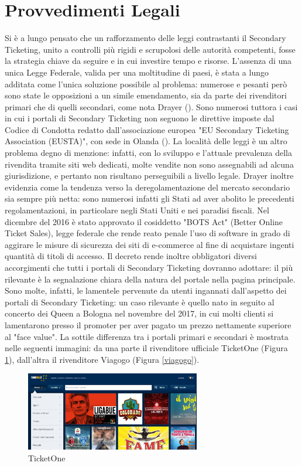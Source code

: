 \section{Provvedimenti Legali}
Si è a lungo pensato che un rafforzamento delle leggi contrastanti il Secondary Ticketing, unito a controlli più rigidi e scrupolosi delle autorità competenti, fosse la strategia chiave da seguire e in cui investire tempo e risorse. 
L'assenza di una unica Legge Federale, valida per una moltitudine di paesi, è stata a lungo additata come l'unica soluzione possibile al problema: numerose e pesanti però sono state le opposizioni a un simile emendamento, sia da parte dei rivenditori primari che di quelli secondari, come nota Drayer (\cite{drayer2011examining}).
Sono numerosi tuttora i casi in cui i portali di Secondary Ticketing non seguono le direttive imposte dal Codice di Condotta redatto dall'associazione europea "EU Secondary Ticketing Association (EUSTA)", con sede in Olanda (\cite{phdthesis}). 
La località delle leggi è un altro problema degno di menzione: infatti, con lo sviluppo e l'attuale prevalenza della rivendita tramite siti web dedicati, molte vendite non sono assegnabili ad alcuna giurisdizione, e pertanto non risultano perseguibili a livello legale. 
Drayer inoltre evidenzia come la tendenza verso la deregolamentazione del mercato secondario sia sempre più netta: sono numerosi infatti gli Stati ad aver abolito le precedenti regolamentazioni, in particolare negli Stati Uniti e nei paradisi fiscali.
Nel dicembre del 2016 è stato approvato il cosiddetto "BOTS Act" (Better Online Ticket Sales), legge federale che rende reato penale l'uso di software in grado di aggirare le misure di sicurezza dei siti di e-commerce al fine di acquistare ingenti quantità di titoli di accesso. Il decreto rende inoltre obbligatori diversi accorgimenti che tutti i portali di Secondary Ticketing dovranno adottare: il più rilevante è la segnalazione chiara della natura del portale nella pagina principale. 
Sono molte, infatti, le lamentele pervenute da utenti ingannati dall'aspetto dei portali di Secondary Ticketing: un caso rilevante è quello nato in seguito al concerto dei Queen a Bologna nel novembre del 2017, in cui molti clienti si lamentarono presso il promoter per aver pagato un prezzo nettamente superiore al "face value".
La sottile differenza tra i portali primari e secondari è mostrata nelle seguenti immagini: da una parte il rivenditore ufficiale TicketOne (Figura \ref{ticketone}), dall'altra il rivenditore Viagogo (Figura \ref{viagogo}).
\begin{figure}[H]
	\centering
	\includegraphics[width=0.68\textwidth]{chapter3/immagini/ticketone_1}
	\caption{TicketOne}
	\label{ticketone}
\end{figure}
